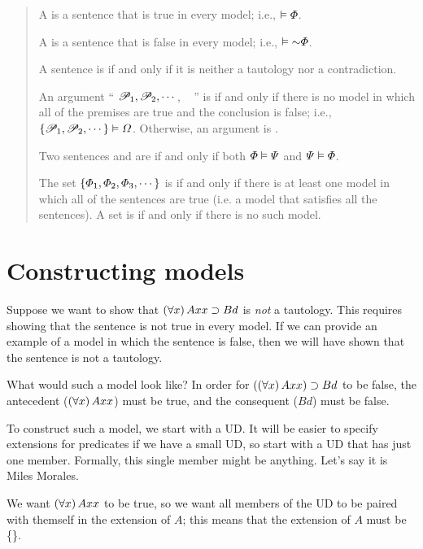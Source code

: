\begin{quote}
A  is a sentence \metaA{} that is true in every model; i.e.,  $\vDash\varPhi{}$.

A  is a sentence \metaA{} that is false in every model; i.e., $\models\enot\metaA{}$.

A sentence is  if and only if it is neither a tautology nor a contradiction.

An argument `` $\mathscr{P}_1, \mathscr{P}_2, \cdots$, \therefore\ \metaC{} '' is  if and only if there is no model in which all of the premises are true and the conclusion is false; i.e., $\{\mathscr{P}_1,\mathscr{P}_2,\cdots\}\vDash\varOmega{}$. Otherwise, an argument is .

Two sentences \metaA{} and \metaB{} are  if and only if both $\varPhi{}\vDash\varPsi{}$ and $\varPsi{}\vDash\varPhi{}$.

The set $\{\varPhi{}_1,\varPhi{}_2,\varPhi{}_3,\cdots\}$ is  if and only if there is at least one model in which all of the sentences are true (i.e. a model that satisfies all the sentences). A set is  if and only if there is no such model.

\end{quote}


\section{Constructing models}

Suppose we want to show that $(\forall x) \,Axx \supset Bd$ is \emph{not} a tautology. This requires showing that the sentence is not true in every model. If we can provide an example of a model in which the sentence is false, then we will have shown that the sentence is not a tautology.

What would such a model look like? In order for $((\forall x) \,Axx) \supset Bd$ to be false, the antecedent ($(\forall x) \, Axx$) must be true, and the consequent ($Bd$) must be false.

To construct such a model, we start with a UD. It will be easier to specify extensions for predicates if we have a small UD, so start with a UD that has just one member. Formally, this single member might be anything. Let's say it is Miles Morales.

We want $(\forall x) \, Axx$ to be true, so we want all members of the UD to be paired with themself in the extension of $A$; this means that the extension of $A$ must be \{\}.

